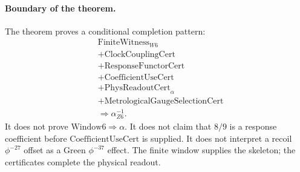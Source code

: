 \paragraph{Boundary of the theorem.}
The theorem proves a conditional completion pattern:
$$
\begin{aligned}
&\mathrm{FiniteWitness}_{W6}\\
&+\mathrm{ClockCouplingCert}\\
&+\mathrm{ResponseFunctorCert}\\
&+\mathrm{CoefficientUseCert}\\
&+\mathrm{PhysReadoutCert}_{\alpha}\\
&+\mathrm{MetrologicalGaugeSelectionCert}\\
&\Rightarrow
\alpha_{Z6}^{-1}.
\end{aligned}
$$
It does not prove $\mathrm{Window6}\Rightarrow\alpha$.  It does not claim that $8/9$ is a response coefficient before $\mathrm{CoefficientUseCert}$ is supplied.  It does not interpret a recoil $\phi^{-27}$ offset as a Green $\phi^{-37}$ effect.  The finite window supplies the skeleton; the certificates complete the physical readout.
